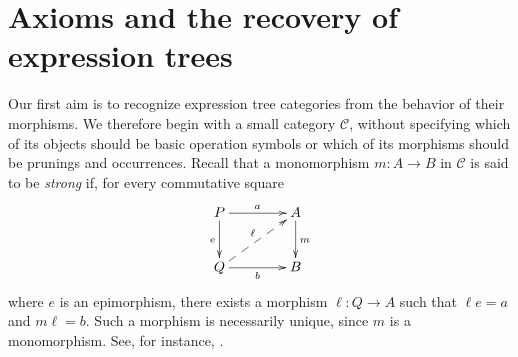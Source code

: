 \documentclass[11pt,a4paper]{article}
\theoremstyle{plain}
\theoremstyle{definition}
\theoremstyle{remark}
\newcommand{\C}{\mathcal C}
\begin{document}


\clearpage
\setcounter{tocdepth}{2}
{\small\setlength{\parskip}{0pt}\tableofcontents}

\section{Axioms and the recovery of expression trees}\label{sec:axioms}\label{sec:preparation}


Our first aim is to recognize expression tree categories from the
behavior of their morphisms. We therefore begin with a small
category $\C$, without specifying which of its objects should be
basic operation symbols or which of its morphisms should be prunings
and occurrences. Recall that a monomorphism $m:A\to B$
in $\C$ is said to be \emph{strong} if, for every commutative square
\[
\xymatrix@C=4em@R=2.5em{
P\ar[r]^a\ar[d]_e&A\ar[d]^m\\
Q\ar[r]_b\ar@{-->}[ur]^{\ell}&B
}
\]
where $e$ is an epimorphism, there exists a morphism $\ell:Q\to A$
such that $\ell e=a$ and $m\ell=b$. Such a morphism is necessarily
unique, since $m$ is a monomorphism. See, for instance,
\cite[Section 0.5]{AR}. 
\end{document}
